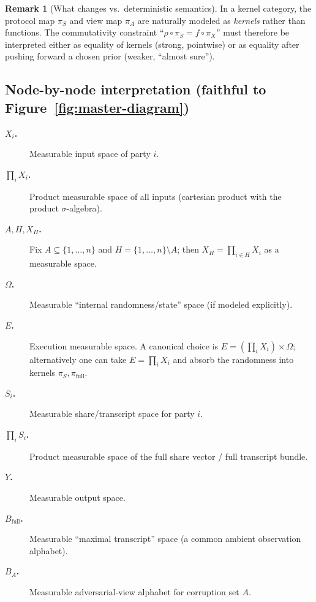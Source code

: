 \documentclass[11pt,a4paper]{article}
\theoremstyle{definition}
\newtheorem{remark}[definition]{Remark}
\theoremstyle{plain}
\begin{document}
\begin{remark}[What changes vs.\ deterministic semantics]
In a kernel category, the protocol map $\pi_S$ and view map $\pi_A$ are naturally modeled as \emph{kernels} rather than functions.
The commutativity constraint ``$\rho\circ\pi_S=f\circ \pi_X$'' must therefore be interpreted either as equality of kernels (strong, pointwise) or as equality after pushing forward a chosen prior (weaker, ``almost sure'').
\end{remark}

\subsection{Node-by-node interpretation (faithful to Figure~\ref{fig:master-diagram})}
\begin{description}
    \item[\textbf{$X_i$.}] Measurable input space of party $i$.
    \item[\textbf{$\prod_i X_i$.}] Product measurable space of all inputs (cartesian product with the product $\sigma$-algebra).
    \item[\textbf{$A,H,X_H$.}] Fix $A\subseteq\{1,\dots,n\}$ and $H=\{1,\dots,n\}\setminus A$; then $X_H=\prod_{i\in H}X_i$ as a measurable space.
    \item[\textbf{$\Omega$.}] Measurable ``internal randomness/state'' space (if modeled explicitly).
    \item[\textbf{$E$.}] Execution measurable space. A canonical choice is $E=(\prod_i X_i)\times \Omega$; alternatively one can take $E=\prod_i X_i$ and absorb the randomness into kernels $\pi_S,\pi_{\mathrm{full}}$.
    \item[\textbf{$S_i$.}] Measurable share/transcript space for party $i$.
    \item[\textbf{$\prod_i S_i$.}] Product measurable space of the full share vector / full transcript bundle.
    \item[\textbf{$Y$.}] Measurable output space.
    \item[\textbf{$B_{\mathrm{full}}$.}] Measurable ``maximal transcript'' space (a common ambient observation alphabet).
    \item[\textbf{$B_A$.}] Measurable adversarial-view alphabet for corruption set $A$.
\end{description}
\end{document}
